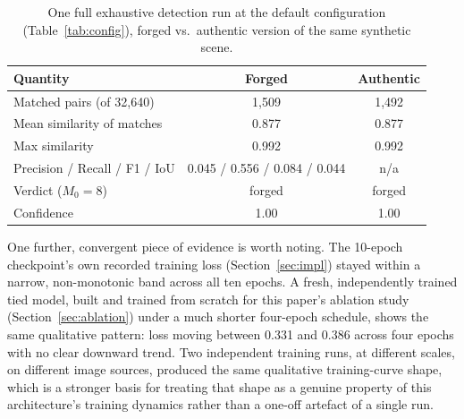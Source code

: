 \documentclass[conference]{IEEEtran}
\begin{document}
\begin{table}[t]
\centering
\caption{One full exhaustive detection run at the default configuration (Table~\ref{tab:config}), forged vs.\ authentic version of the same synthetic scene.}
\label{tab:e2e}
\setlength{\tabcolsep}{3pt}
\begin{tabular}{lcc}
\toprule
\textbf{Quantity} & \textbf{Forged} & \textbf{Authentic}\\
\midrule
Matched pairs (of 32,640) & 1,509 & 1,492\\
Mean similarity of matches & 0.877 & 0.877\\
Max similarity & 0.992 & 0.992\\
Precision / Recall / F1 / IoU & 0.045 / 0.556 / 0.084 / 0.044 & n/a\\
Verdict ($M_0 = 8$) & forged & forged\\
Confidence & 1.00 & 1.00\\
\bottomrule
\end{tabular}
\end{table}

One further, convergent piece of evidence is worth noting. The 10-epoch checkpoint's own recorded training loss (Section~\ref{sec:impl}) stayed within a narrow, non-monotonic band across all ten epochs. A fresh, independently trained tied model, built and trained from scratch for this paper's ablation study (Section~\ref{sec:ablation}) under a much shorter four-epoch schedule, shows the same qualitative pattern: loss moving between 0.331 and 0.386 across four epochs with no clear downward trend. Two independent training runs, at different scales, on different image sources, produced the same qualitative training-curve shape, which is a stronger basis for treating that shape as a genuine property of this architecture's training dynamics rather than a one-off artefact of a single run.
\end{document}
